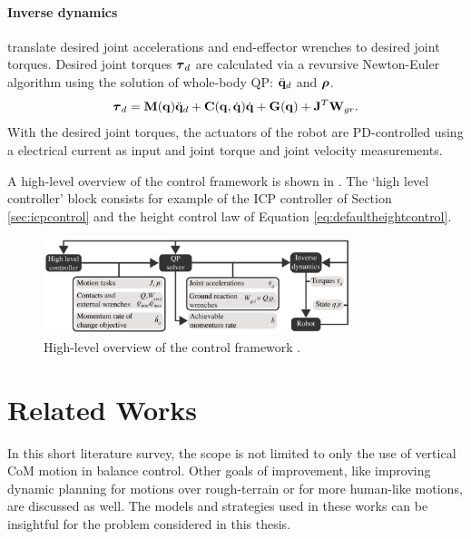 \paragraph{Inverse dynamics} translate desired joint accelerations and end-effector wrenches to desired joint torques. Desired joint torques $\boldsymbol{\tau}_d$ are calculated via a revursive Newton-Euler algorithm using the solution of whole-body \ac{QP}: $\ddot{\mathbf{q}}_d$ and $\boldsymbol{\rho}$.
\begin{equation}
    \boldsymbol{\tau}_d = \mathbf{M}(\mathbf{q})\ddot{\mathbf{q}}_d + \mathbf{C}(\mathbf{q},\dot{\mathbf{q}})\dot{\mathbf{q}} + \mathbf{G}(\mathbf{q}) + \mathbf{J}^T \mathbf{W}_{gr}.
\end{equation}
With the desired joint torques, the actuators of the robot are PD-controlled using a electrical current as input and joint torque and joint velocity measurements.

A high-level overview of the control framework is shown in . The `high level controller' block consists for example of the \ac{ICP} controller of Section \ref{sec:icpcontrol} and the height control law of Equation \eqref{eq:defaultheightcontrol}.
\begin{figure}[h]
\centering
\includegraphics[width=0.8\textwidth]{STYLESTUFF/controlframework.png}
\caption{High-level overview of the control framework \cite{koolen2016design}. }
\label{fig:framework}
\end{figure}

\section{Related Works}\label{sec:relatedworksheight}
In this short literature survey, the scope is not limited to only the use of vertical \ac{CoM} motion in balance control. Other goals of improvement, like improving dynamic planning for motions over rough-terrain or for more human-like motions, are discussed as well. The models and strategies used in these works can be insightful for the problem considered in this thesis.

